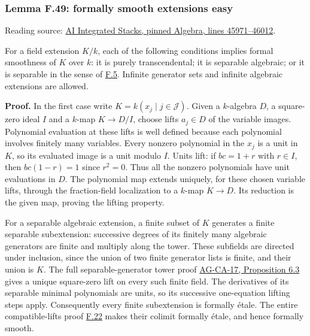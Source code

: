 \documentclass[11pt,a4paper,openany]{report}
\begin{document}
\label{AG-RG-S05-algebra-lemma-formally-smooth-extensions-easy}

\subsubsection{Lemma F.49: formally smooth extensions easy}\label{AG-RG-S05-lemma-f.49-formally-smooth-extensions-easy}

Reading source: \href{https://github.com/KokunoYumeto/unofficial-stacks-project-ai-drafts/blob/565b10e987aba5969b21145a0833f42d69f96790/algebra.tex\#L45971-L46012}{AI Integrated Stacks, pinned Algebra, lines 45971--46012}.

For a field extension \(K/k\), each of the following conditions implies formal smoothness of \(K\) over \(k\): it is purely transcendental; it is separable algebraic; or it is separable in the sense of \hyperref[AG-RG-S05-algebra-definition-separable-field-extension]{F.5}. Infinite generator sets and infinite algebraic extensions are allowed.

\textbf{Proof.} In the first case write \(K=k(x_j\mid j\in\mathcal J)\). Given a \(k\)-algebra \(D\), a square-zero ideal \(I\) and a \(k\)-map \(K\to D/I\), choose lifts \(a_j\in D\) of the variable images. Polynomial evaluation at these lifts is well defined because each polynomial involves finitely many variables. Every nonzero polynomial in the \(x_j\) is a unit in \(K\), so its evaluated image is a unit modulo \(I\). Units lift: if \(bc=1+r\) with \(r\in I\), then \(bc(1-r)=1\) since \(r^2=0\). Thus all the nonzero polynomials have unit evaluations in \(D\). The polynomial map extends uniquely, for these chosen variable lifts, through the fraction-field localization to a \(k\)-map \(K\to D\). Its reduction is the given map, proving the lifting property.

For a separable algebraic extension, a finite subset of \(K\) generates a finite separable subextension: successive degrees of its finitely many algebraic generators are finite and multiply along the tower. These subfields are directed under inclusion, since the union of two finite generator lists is finite, and their union is \(K\). The full separable-generator tower proof \href{https://github.com/KokunoYumeto/open-math-courses/blob/d02d0a3669f42579db037cd44de1d113fdd770a1/docs/courses/AG-CA/src/formally-smooth-unramified-and-etale-ring-maps.md}{AG-CA-17, Proposition 6.3} gives a unique square-zero lift on every such finite field. The derivatives of its separable minimal polynomials are units, so its successive one-equation lifting steps apply. Consequently every finite subextension is formally étale. The entire compatible-lifts proof \hyperref[AG-RG-S05-algebra-lemma-colimit-formally-etale]{F.22} makes their colimit formally étale, and hence formally smooth.
\end{document}
